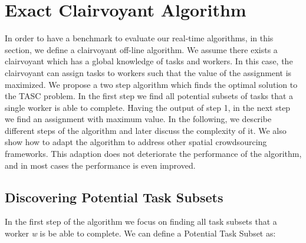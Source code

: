 \section{Exact Clairvoyant Algorithm}
\label{sec:exactalgo}



In order to have a benchmark to evaluate our real-time algorithms, in this section, we define a clairvoyant off-line algorithm. We assume there exists a clairvoyant which has a global knowledge of tasks and workers. In this case, the clairvoyant can assign tasks to workers such that the value of the assignment is maximized. We propose a two step algorithm which finds the optimal solution to the TASC problem. In the first step we find all potential subsets of tasks that a single worker is able to complete. Having the output of step 1, in the next step we find an assignment with maximum value. In the following, we describe different steps of the algorithm and later discuss the complexity of it. We also show how to adapt the algorithm to address other spatial crowdsourcing frameworks. This adaption does not deteriorate the performance of the algorithm, and in most cases the performance is even improved.

\subsection{Discovering Potential Task Subsets}
\label{subsec:FindPTS}
In the first step of the algorithm we focus on finding all task subsets that a worker \emph{w} is be able to complete. We can define a Potential Task Subset as:

